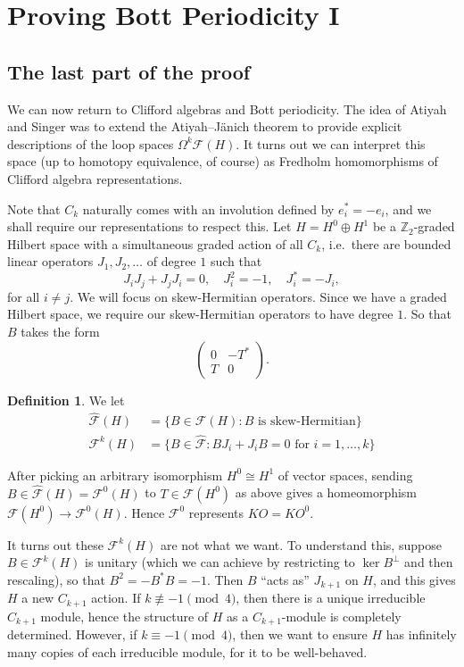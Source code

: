 \documentclass{shortart}
\theoremstyle{definition}
\newtheorem*{defi}{Definition}
\newcommand\Z{\mathbb{Z}}
\begin{document}
\section{Proving Bott Periodicity I}
\subsection{The last part of the proof}
We can now return to Clifford algebras and Bott periodicity. The idea of Atiyah and Singer \cite{atiyahsinger1969} was to extend the Atiyah--J\"anich theorem to provide explicit descriptions of the loop spaces $\Omega^k \mathcal{F}(H)$. It turns out we can interpret this space (up to homotopy equivalence, of course) as Fredholm homomorphisms of Clifford algebra representations.

Note that $C_k$ naturally comes with an involution defined by $e_i^* = - e_i$, and we shall require our representations to respect this. Let $H = H^0 \oplus H^1$ be a $\Z_2$-graded Hilbert space with a simultaneous graded action of all $C_k$, i.e.\ there are bounded linear operators $J_1, J_2, \ldots$ of degree $1$ such that
\[
  J_i J_j + J_j J_i = 0,\quad J_i^2 = -1,\quad J_i^* = -J_i,
\]
for all $i \not= j$. We will focus on skew-Hermitian operators. Since we have a graded Hilbert space, we require our skew-Hermitian operators to have degree $1$. So that $B$ takes the form
\[
  \begin{pmatrix}
    0 & -T^*\\
    T & 0
  \end{pmatrix}.
\]
\begin{defi}
  We let
  \begin{align*}
    \hat{\mathcal{F}}(H) &= \{B \in \mathcal{F}(H): B\text{ is skew-Hermitian}\}\\
    \mathcal{F}^k(H) &= \{B \in \hat{\mathcal{F}}: BJ_i + J_i B = 0\text{ for }i = 1, \ldots, k\}
  \end{align*}
\end{defi}
After picking an arbitrary isomorphism $H^0 \cong H^1$ of vector spaces, sending $B \in \hat{\mathcal{F}}(H) = \mathcal{F}^0(H)$ to $T \in \mathcal{F}(H^0)$ as above gives a homeomorphism $\mathcal{F}(H^0) \to \mathcal{F}^0(H)$. Hence $\mathcal{F}^0$ represents $KO = KO^0$. 

It turns out these $\mathcal{F}^k(H)$ are not what we want. To understand this, suppose $B \in \mathcal{F}^k(H)$ is unitary (which we can achieve by restricting to $\ker B^\perp$ and then rescaling), so that $B^2 = -B^* B = -1$. Then $B$ ``acts as'' $J_{k + 1}$ on $H$, and this gives $H$ a new $C_{k + 1}$ action. If $k \not \equiv -1 \pmod 4$, then there is a unique irreducible $C_{k + 1}$ module, hence the structure of $H$ as a $C_{k + 1}$-module is completely determined. However, if $k \equiv -1 \pmod 4$, then we want to ensure $H$ has infinitely many copies of each irreducible module, for it to be well-behaved.
\end{document}
